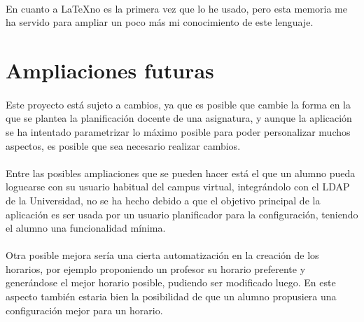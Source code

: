 \documentclass[a4paper,11pt]{article} %
\begin{document}
\paragraph{}
En cuanto a \LaTeX no es la primera vez que lo he usado, pero esta memoria me ha servido para ampliar un poco más mi conocimiento de este lenguaje.







\section{Ampliaciones futuras}
\paragraph{}
Este proyecto está sujeto a cambios, ya que es posible que cambie la forma en la que se plantea la planificación docente de una asignatura, y aunque la aplicación se ha intentado parametrizar lo máximo posible para poder personalizar muchos aspectos, es posible que sea necesario realizar cambios.
\paragraph{}
Entre las posibles ampliaciones que se pueden hacer está el que un alumno pueda loguearse con su usuario habitual del campus virtual, integrándolo con el LDAP de la Universidad, no se ha hecho debido a que el objetivo principal de la aplicación es ser usada por un usuario planificador para la configuración, teniendo el alumno una funcionalidad mínima.
\paragraph{}
Otra posible mejora sería una cierta automatización en la creación de los horarios, por ejemplo proponiendo un profesor su horario preferente y generándose el mejor horario posible, pudiendo ser modificado luego. En este aspecto también estaria bien la posibilidad de que un alumno propusiera una configuración mejor para un horario.

\end{document}
